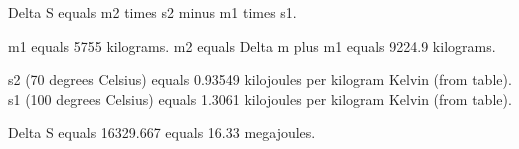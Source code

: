 Delta S equals m2 times s2 minus m1 times s1.  

m1 equals 5755 kilograms.  
m2 equals Delta m plus m1 equals 9224.9 kilograms.  

s2 (70 degrees Celsius) equals 0.93549 kilojoules per kilogram Kelvin (from table).  
s1 (100 degrees Celsius) equals 1.3061 kilojoules per kilogram Kelvin (from table).  

Delta S equals 16329.667 equals 16.33 megajoules.